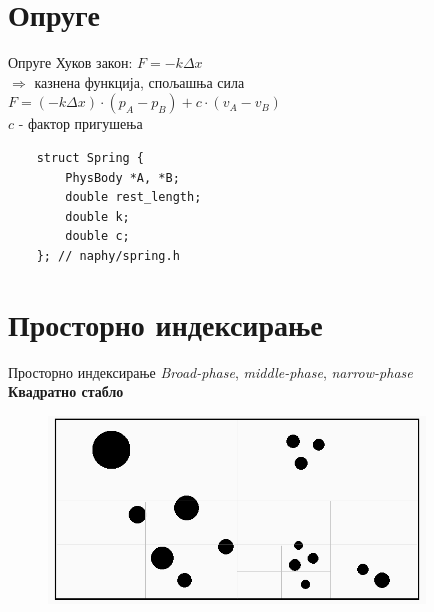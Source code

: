 \documentclass[]{beamer}
\begin{document}

\section{Опруге}
\begin{frame}[fragile]{Опруге}
    Хуков закон: $F = -k \Delta x$ \\
    $\Rightarrow$ казнена функција, спољашња сила \\
    $F = (-k\Delta x) \cdot (p_A - p_B) + c \cdot (v_A - v_B)$ \\
    $c$ - фактор пригушења
    
    \begin{verbatim}
    struct Spring {
        PhysBody *A, *B;
        double rest_length;
        double k;
        double c;
    }; // naphy/spring.h
    \end{verbatim}
\end{frame}


\section{Просторно индексирање}
\begin{frame}[fragile]{Просторно индексирање}
    \textit{Broad-phase}, \textit{middle-phase}, \textit{narrow-phase} \\
    \textbf{Квадратно стабло}
    \begin{figure}[htp]
        \centering
        \includegraphics[width=10cm]{img_02.png}
    \end{figure}
\end{frame}
\end{document}
